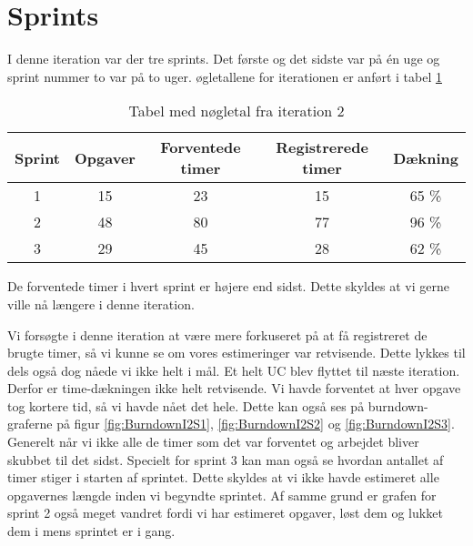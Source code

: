 \section{Sprints}

I denne iteration var der tre sprints. Det første og det sidste var på én uge og sprint nummer to var på to uger.
øgletallene for iterationen er anført i tabel \ref{table:iteration2sprints}

\begin{table}
\centering
\begin{tabular}{|c|c|c|c|c|}
\hline 
\textbf{Sprint} 	& \textbf{Opgaver} 	& \textbf{Forventede timer} 	& \textbf{Registrerede timer} 	& \textbf{Dækning} \\ 
\hline
1 		& 15 		& 23 				& 15						& 65 \% \\ 
\hline 
2 		& 48 		& 80 				& 77						& 96 \% \\ 
\hline 
3 		& 29 		& 45 				& 28						& 62 \% \\ 
\hline 
\end{tabular}
\caption{Tabel med nøgletal fra iteration 2}
\label{table:iteration2sprints}
\end{table}

De forventede timer i hvert sprint er højere end sidst. Dette skyldes at vi gerne ville nå længere i denne iteration.

Vi forsøgte i denne iteration at være mere forkuseret på at få registreret de brugte timer, så vi kunne se om vores estimeringer var retvisende. Dette lykkes til dels også dog nåede vi ikke helt i mål. Et helt UC blev flyttet til næste iteration. Derfor er time-dækningen ikke helt retvisende. Vi havde forventet at hver opgave tog kortere tid, så vi havde nået det hele. Dette kan også ses på burndown-graferne på figur \ref{fig:BurndownI2S1}, \ref{fig:BurndownI2S2} og \ref{fig:BurndownI2S3}. Generelt når vi ikke alle de timer som det var forventet og arbejdet bliver skubbet til det sidst.
Specielt for sprint 3 kan man også se hvordan antallet af timer stiger i starten af sprintet. Dette skyldes at vi ikke havde estimeret alle opgavernes længde inden vi begyndte sprintet. Af samme grund er grafen for sprint 2 også meget vandret fordi vi har estimeret opgaver, løst dem og lukket dem i mens sprintet er i gang.

\begin{minipage}{0.5\textwidth}
\end{minipage}
\begin{minipage}{0.5\textwidth}
\end{minipage}
